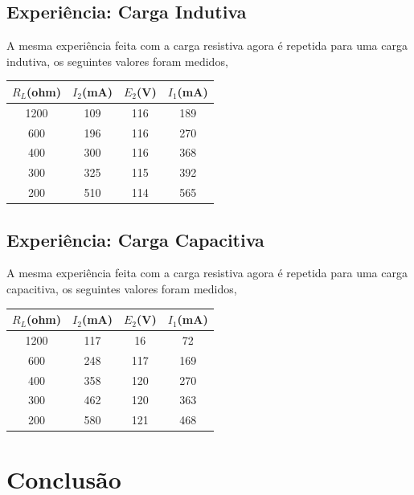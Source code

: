 \documentclass[paper=a4, fontsize=11pt]{article}
\begin{document}
\subsection{Experiência: Carga Indutiva}

A mesma experiência feita com a carga resistiva agora é repetida para uma carga
indutiva, os seguintes valores foram medidos,

\renewcommand{\arraystretch}{1.5}
\begin{center}

    \begin{tabular}{c||c||c||c}
        $R_L$(ohm) & $I_2$(mA) & $E_2$(V) & $I_1$(mA) \\
        \hline
        1200 & 109 & 116 & 189 \\
        600 & 196 & 116 & 270 \\
        400 & 300 & 116 & 368 \\
        300 & 325 & 115 & 392 \\
        200 & 510 & 114 & 565 \\
    \end{tabular}
\end{center}


\subsection{Experiência: Carga Capacitiva}

A mesma experiência feita com a carga resistiva agora é repetida para uma carga
capacitiva, os seguintes valores foram medidos,

\renewcommand{\arraystretch}{1.5}
\begin{center}

    \begin{tabular}{c||c||c||c}
        $R_L$(ohm) & $I_2$(mA) & $E_2$(V) & $I_1$(mA) \\
        \hline
        1200 & 117 & 16 & 72 \\
        600 & 248 & 117 & 169 \\
        400 & 358 & 120 & 270 \\
        300 & 462 & 120 & 363 \\
        200 & 580 & 121 & 468 \\
    \end{tabular}
\end{center}


\section{Conclusão}
\end{document}
